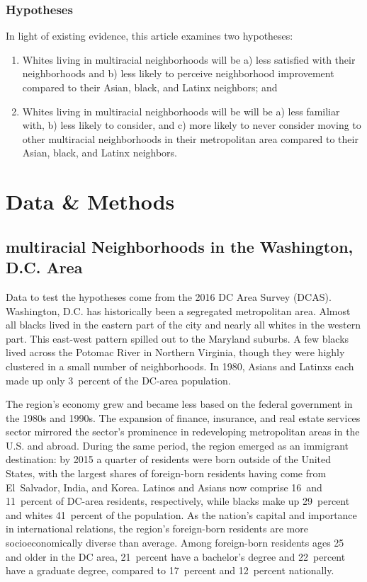 \documentclass{baderart}
\begin{document}
\subsubsection{Hypotheses}\label{hypotheses}

In light of existing evidence, this article examines two hypotheses:


\begin{enumerate} 

\item   Whites living in multiracial neighborhoods will be a) less satisfied  with their neighborhoods and b) less likely to perceive neighborhood  improvement compared to their Asian, black, and Latinx neighbors; and 

\item   Whites living in multiracial neighborhoods will be will be a) less familiar with, b) less likely to consider, and c) more likely to never consider moving to other multiracial neighborhoods in their metropolitan area compared to their Asian, black, and Latinx neighbors. 

\end{enumerate}

\section{Data \& Methods}\label{data}
\subsection{multiracial Neighborhoods in the Washington, D.C. Area}\label{multiracial-neighborhoods-in-the-washington-d.c.-area}

Data to test the hypotheses come from the 2016 DC Area Survey (DCAS). Washington, D.C. has historically been a segregated metropolitan area. Almost all blacks lived in the eastern part of the city and nearly all whites in the western part. This east-west pattern spilled out to the Maryland suburbs. A few blacks lived across the Potomac River in Northern Virginia, though they were highly clustered in a small number of neighborhoods. In 1980, Asians and Latinxs each made up only 3~percent of the DC-area population.

The region's economy grew and became less based on the federal government in the 1980s and 1990s. The expansion of finance, insurance, and real estate services sector mirrored the sector's prominence in redeveloping metropolitan areas in the U.S. and abroad. During the same period, the region emerged as an immigrant destination: by 2015 a quarter of residents were born outside of the United States, with the largest shares of foreign-born residents having come from El~Salvador, India, and Korea. Latinos and Asians now comprise 16~and 11~percent of DC-area residents, respectively, while blacks make up 29~percent and whites 41~percent of the population. As the nation's capital and importance in international relations, the region's foreign-born residents are more socioeconomically diverse than average. Among foreign-born residents ages 25 and older in the DC area, 21~percent have a bachelor's degree and 22~percent have a graduate degree, compared to 17~percent and 12~percent nationally. 
\end{document}

